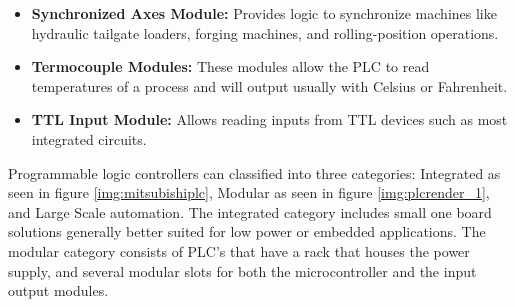 \begin{itemize}
	\item \textbf{Synchronized Axes Module:} Provides logic to synchronize machines like hydraulic tailgate loaders, forging machines, and rolling-position operations.
	\item \textbf{Termocouple Modules:} These modules allow the PLC to read temperatures of a process and will output usually with Celsius or Fahrenheit.
	\item \textbf{TTL Input Module:} Allows reading inputs from TTL devices such as most integrated circuits.
\end{itemize}

Programmable logic controllers can classified into three categories: Integrated as seen in figure \ref{img:mitsubishiplc}, Modular as seen in figure \ref{img:plcrender_1}, and Large Scale automation. The integrated category includes small one board solutions generally better suited for low power or embedded applications. The modular category consists of PLC's that have a rack that houses the power supply, and several modular slots for both the microcontroller and the input output modules.



